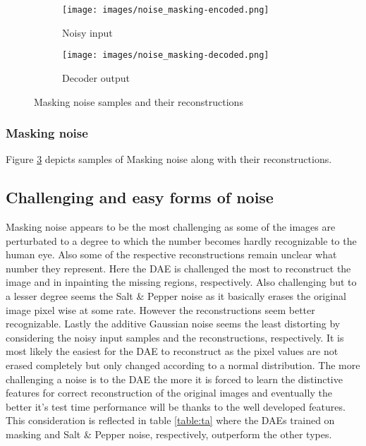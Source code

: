\documentclass[10pt, a4paper]{article}
\begin{document}
    \begin{figure}[h]
    \begin{subfigure}{0.2\textwidth}
    \texttt{[image: images/noise\_masking-encoded.png]} 
    \caption{Noisy input}
    \label{fig:subim1}
    \end{subfigure}
    \begin{subfigure}{0.2\textwidth}
    \texttt{[image: images/noise\_masking-decoded.png]}
    \caption{Decoder output}
    \label{fig:subim2}
    \end{subfigure}
    \caption{Masking noise samples and their reconstructions}
    \label{fig:figma}
    \end{figure} 
    
    \subsubsection{Masking noise}
    Figure \ref{fig:figma} depicts samples of Masking noise along with their reconstructions.
    
    \subsection{Challenging and easy forms of noise}
    Masking noise appears to be the most challenging as some of the images are perturbated to a degree to which the number becomes hardly recognizable to the human eye. Also some of the respective reconstructions remain unclear what number they represent. Here the DAE is challenged the most to reconstruct the image and in inpainting the missing regions, respectively.\newline
    Also challenging but to a lesser degree seems the Salt \& Pepper noise as it basically erases the original image pixel wise at some rate. However the reconstructions seem better recognizable. Lastly the additive Gaussian noise seems the least distorting by considering the noisy input samples and the reconstructions, respectively. It is most likely the easiest for the DAE to reconstruct as the pixel values are not erased completely but only changed according to a normal distribution.\newline
    The more challenging a noise is to the DAE the more it is forced to learn the distinctive features for correct reconstruction of the original images and eventually the better it's test time performance will be thanks to the well developed features. This consideration is reflected in table \ref{table:ta} where the DAEs trained on masking and Salt \& Pepper noise, respectively, outperform the other types.
    
\end{document}
